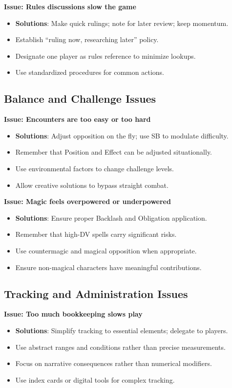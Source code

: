 \textbf{Issue: Rules discussions slow the game}
\begin{itemize}
\item \textbf{Solutions}: Make quick rulings; note for later review; keep momentum.
\item Establish “ruling now, researching later” policy.
\item Designate one player as rules reference to minimize lookups.
\item Use standardized procedures for common actions.
\end{itemize}

\subsection{Balance and Challenge Issues}
\label{subsec:balance-issues}

\textbf{Issue: Encounters are too easy or too hard}
\begin{itemize}
\item \textbf{Solutions}: Adjust opposition on the fly; use SB to modulate difficulty.
\item Remember that Position and Effect can be adjusted situationally.
\item Use environmental factors to change challenge levels.
\item Allow creative solutions to bypass straight combat.
\end{itemize}

\textbf{Issue: Magic feels overpowered or underpowered}
\begin{itemize}
\item \textbf{Solutions}: Ensure proper Backlash and Obligation application.
\item Remember that high-DV spells carry significant risks.
\item Use countermagic and magical opposition when appropriate.
\item Ensure non-magical characters have meaningful contributions.
\end{itemize}

\subsection{Tracking and Administration Issues}
\label{subsec:tracking-issues}

\textbf{Issue: Too much bookkeeping slows play}
\begin{itemize}
\item \textbf{Solutions}: Simplify tracking to essential elements; delegate to players.
\item Use abstract ranges and conditions rather than precise measurements.
\item Focus on narrative consequences rather than numerical modifiers.
\item Use index cards or digital tools for complex tracking.
\end{itemize}

